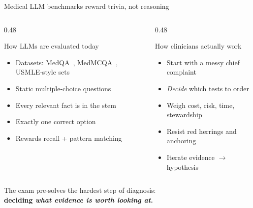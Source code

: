 \documentclass[aspectratio=169,t]{beamer}
\begin{document}
\begin{frame}{Medical LLM benchmarks reward trivia, not reasoning}
  \begin{columns}[T,onlytextwidth]
    \begin{column}{0.48\textwidth}
      \begin{exampleblock}{How LLMs are evaluated today}
        \begin{itemize}\setlength\itemsep{0.1em}
          \item Datasets: MedQA~\cite{jin2021medqa},
                MedMCQA~\cite{pal2022medmcqa}, USMLE-style sets
          \item Static multiple-choice questions
          \item Every relevant fact is in the stem
          \item Exactly one correct option
          \item Rewards \alert{recall + pattern matching}
        \end{itemize}
      \end{exampleblock}
    \end{column}%
    \hfill
    \begin{column}{0.48\textwidth}
      \begin{alertblock}{How clinicians actually work}
        \begin{itemize}\setlength\itemsep{0.1em}
          \item Start with a messy chief complaint
          \item \emph{Decide} which tests to order
          \item Weigh cost, risk, time, stewardship
          \item Resist red herrings and anchoring
          \item Iterate \alert{evidence $\rightarrow$ hypothesis}
        \end{itemize}
      \end{alertblock}
    \end{column}
  \end{columns}

  \vspace{7mm}
  \centering\footnotesize
  The exam pre-solves the hardest step of diagnosis:\\[0.5mm]
  {\normalsize\color{CERNblue}\bfseries deciding \emph{what evidence is worth looking at}.}
\end{frame}
\end{document}
